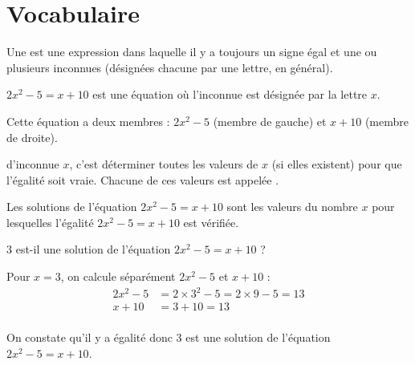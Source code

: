 \section{Vocabulaire}\label{EQcours01}



\begin{definition}
Une  est une expression dans laquelle il y a toujours un signe égal et une ou plusieurs inconnues (désignées chacune par une lettre, en général).
\end{definition}


\begin{exemple*1}

$2x^2 -5 = x + 10$ est une équation où l'inconnue est désignée par la lettre $x$.

Cette équation a deux membres : $2x^2 -5$ (membre de gauche) et $x + 10$ (membre de droite).
\end{exemple*1}

\vspace{2em}

\begin{definition}
 d'inconnue $x$, c'est déterminer toutes les valeurs de $x$ (si elles existent) pour que l'égalité soit vraie. Chacune de ces valeurs est appelée .
\end{definition} 
 


\begin{exemple*1}
Les solutions de l'équation $2x^2 -5 = x + 10$ sont les valeurs du nombre $x$ pour lesquelles l'égalité  $2x^2 -5 = x + 10$  est vérifiée.
\end{exemple*1}

\begin{exemple*1}
3 est-il une solution de l'équation $2x^2 -5 = x + 10$ ?

\correction

Pour $x = 3$, on calcule séparément $2x^2 -5$ et $x + 10$ :
\begin{align*}
2x^2 -5 &= 2  \times 3^2 -5 = 2  \times 9 -5 = 13 \\
x + 10 &= 3 + 10 = 13 \\
\end{align*}
 
On constate qu'il y a égalité donc 3 est une solution de l'équation $2x^2 -5 = x + 10$.

\end{exemple*1}


